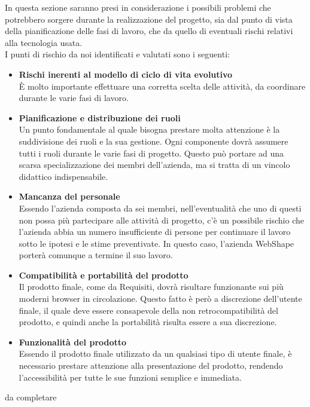 In questa sezione saranno presi in considerazione i possibili problemi che potrebbero sorgere durante la realizzazione del progetto, sia dal punto di vista della pianificazione delle fasi di lavoro, che da quello di eventuali rischi relativi alla tecnologia usata.\\
I punti di rischio da noi identificati e valutati sono i seguenti:
\begin{itemize}
\item \textbf{Rischi inerenti al modello di ciclo di vita evolutivo}\\
\`E molto importante effettuare una corretta scelta delle attivit\`a, da coordinare durante le varie fasi di lavoro.\\
\item \textbf{Pianificazione e distribuzione dei ruoli}\\ 
Un punto fondamentale al quale bisogna prestare molta attenzione \`e la suddivisione dei ruoli e la sua gestione. Ogni componente dovr\`a assumere tutti i ruoli durante le varie fasi di progetto. Questo pu\`o portare ad una scarsa specializzazione dei membri dell'azienda, ma si tratta di un vincolo didattico indispensabile.\\
\item \textbf{Mancanza del personale}\\
Essendo l'azienda composta da sei membri, nell'eventualit\`a che uno di questi non possa pi\`u partecipare alle attivit\`a di progetto, c'\`e un possibile rischio che l'azienda abbia un numero insufficiente di persone per continuare il lavoro sotto le ipotesi e le stime preventivate. In questo caso, l'azienda WebShape porter\`a comunque a termine il suo lavoro.\\
\item \textbf{Compatibilit\`a e portabilit\`a del prodotto}\\
Il prodotto finale, come da Requisiti, dovr\`a risultare funzionante sui pi\`u moderni browser in circolazione. Questo fatto \`e per\`o  a discrezione dell'utente finale, il quale deve essere consapevole della non retrocompatibilit\`a del prodotto, e quindi anche la portabilit\`a risulta essere  a sua discrezione.\\
\item \textbf{Funzionalit\`a del prodotto}\\
Essendo il prodotto finale utilizzato da un qualsiasi tipo di utente finale, \`e necessario prestare attenzione alla presentazione del prodotto, rendendo l'accessibilit\`a per tutte le sue funzioni semplice e immediata.
\end{itemize}			

da completare\\


